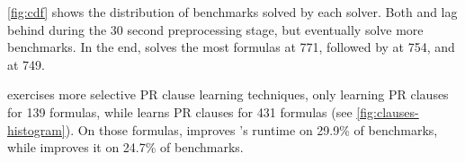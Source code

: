 \autoref{fig:cdf} shows the distribution of benchmarks solved by each solver.
Both \prelearn and \tool lag behind \cadical during the 30 second preprocessing
stage, but eventually solve more benchmarks. In the end, \prelearn solves the most
formulas at 771, followed by \tool at 754, and \cadical at 749. 






\tool exercises more selective PR clause learning techniques, only learning PR
clauses for 139 formulas, while \prelearn learns PR clauses for 431 formulas
(see \autoref{fig:clauses-histogram}). On those formulas, \tool improves
\cadical's runtime on 29.9\% of benchmarks, while \prelearn improves it on
24.7\% of benchmarks.





















